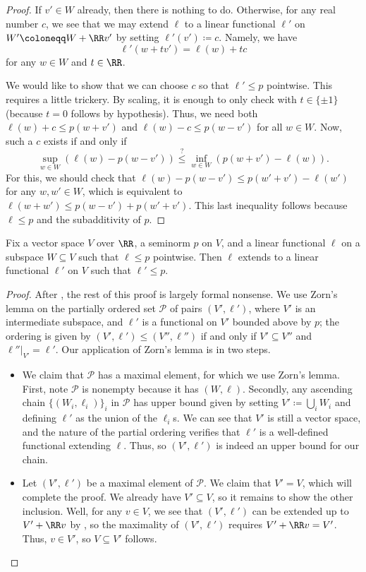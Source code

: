 \documentclass[notes.tex]{subfiles}
\begin{document}
\begin{proof}
	If $v'\in W$ already, then there is nothing to do. Otherwise, for any real number $c$, we see that we may extend $\ell$ to a linear functional $\ell'$ on $W'\coloneqq W+\RR v'$ by setting $\ell'(v')\coloneqq c$. Namely, we have
	\[\ell'(w+tv')=\ell(w)+tc\]
	for any $w\in W$ and $t\in\RR$.
	
	We would like to show that we can choose $c$ so that $\ell'\le p$ pointwise. This requires a little trickery. By scaling, it is enough to only check with $t\in\{\pm1\}$ (because $t=0$ follows by hypothesis). Thus, we need both $\ell(w)+c\le p(w+v')$ and $\ell(w)-c\le p(w-v')$ for all $w\in W$. Now, such a $c$ exists if and only if
	\[\sup_{w\in W}(\ell(w)-p(w-v'))\stackrel?\le\inf_{w\in W}(p(w+v')-\ell(w)).\]
	For this, we should check that $\ell(w)-p(w-v')\le p(w'+v')-\ell(w')$ for any $w,w'\in W$, which is equivalent to $\ell(w+w')\le p(w-v')+p(w'+v')$. This last inequality follows because $\ell\le p$ and the subadditivity of $p$.
\end{proof}
\begin{theorem}
	Fix a vector space $V$ over $\RR$, a seminorm $p$ on $V$, and a linear functional $\ell$ on a subspace $W\subseteq V$ such that $\ell\le p$ pointwise. Then $\ell$ extends to a linear functional $\ell'$ on $V$ such that $\ell'\le p$.
\end{theorem}
\begin{proof}
	After , the rest of this proof is largely formal nonsense. We use Zorn's lemma on the partially ordered set $\mathcal P$ of pairs $(V',\ell')$, where $V'$ is an intermediate subspace, and $\ell'$ is a functional on $V'$ bounded above by $p$; the ordering is given by $(V',\ell')\le(V'',\ell'')$ if and only if $V'\subseteq V''$ and $\ell''|_{V'}=\ell'$. Our application of Zorn's lemma is in two steps.
	\begin{itemize}
		\item We claim that $\mathcal P$ has a maximal element, for which we use Zorn's lemma. First, note $\mathcal P$ is nonempty because it has $(W,\ell)$. Secondly, any ascending chain $\{(W_i,\ell_i)\}_i$ in $\mathcal P$ has upper bound given by setting $V'\coloneqq\bigcup_iW_i$ and defining $\ell'$ as the union of the $\ell_i$s. We can see that $V'$ is still a vector space, and the nature of the partial ordering verifies that $\ell'$ is a well-defined functional extending $\ell$. Thus, so $(V',\ell')$ is indeed an upper bound for our chain.
		\item Let $(V',\ell')$ be a maximal element of $\mathcal P$. We claim that $V'=V$, which will complete the proof. We already have $V'\subseteq V$, so it remains to show the other inclusion. Well, for any $v\in V$, we see that $(V',\ell')$ can be extended up to $V'+\RR v$ by , so the maximality of $(V',\ell')$ requires $V'+\RR v=V'$. Thus, $v\in V'$, so $V\subseteq V'$ follows.
		\qedhere
	\end{itemize}
\end{proof}
\end{document}
